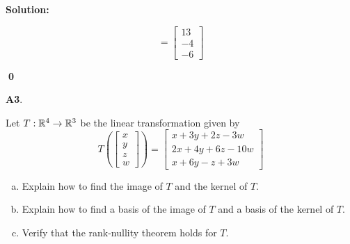 \documentclass{article}
\newenvironment{problem}[1]
{
  \begin{flushleft}
  \textbf{#1}.
  \ignorespaces
}
{
  \end{flushleft}
}
\newenvironment{solution}
{
  \ignorespaces
  \textbf{Solution:}
}
{
  \ignorespacesafterend
  \begin{flushright}
  {\bfseries \qed}
  \end{flushright}
}
\begin{document}
\begin{solution}
\begin{enumerate}[(a)]
\[= \begin{bmatrix} 13 \\ -4 \\ -6\end{bmatrix} \]
\end{enumerate}
\end{solution}

\begin{problem}{A3}
Let \(T: \mathbb{R}^4 \rightarrow \mathbb{R}^3\) be the linear transformation given by
\[
  T\left(\begin{bmatrix}x\\y\\z\\w\end{bmatrix} \right) =
  \begin{bmatrix}
    x+3y+2z-3w \\
    2x+4y+6z-10w \\
    x+6y-z+3w
  \end{bmatrix}
\]
\begin{enumerate}[(a)]
\item Explain how to find the image of \(T\) and the kernel of \(T\). 
\item Explain how to find a basis of the image of \(T\) and a basis of the kernel of \(T\). 
\item Verify that the rank-nullity theorem holds for \(T\).
\end{enumerate}
\end{problem}
\end{document}
